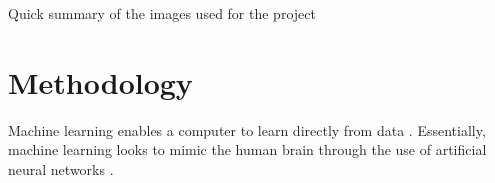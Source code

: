 \documentclass[12pt, onecolumn]{article}
\begin{document}
            Quick summary of the images used for the project
    
    
    
    
    
    
    
    
    
    
    
\newpage

\section{Methodology}
\label{Methodology}

    

    Machine learning enables a computer to learn directly from data  \cite{what_is_ml}. Essentially, machine learning looks to mimic the human brain through the use of artificial neural networks \cite{first_neural_network}. 
    
\end{document}
